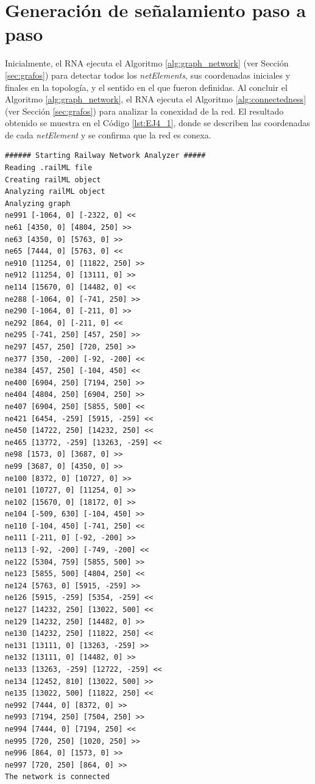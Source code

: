 \section{Generación de señalamiento paso a paso}

Inicialmente, el RNA ejecuta el Algoritmo \ref{alg:graph_network} (ver Sección \ref{sec:grafos}) para detectar todos los \textit{netElements}, sus coordenadas iniciales y finales en la topología, y el sentido en el que fueron definidas. Al concluir el Algoritmo \ref{alg:graph_network}, el RNA ejecuta el Algoritmo \ref{alg:connectedness} (ver Sección \ref{sec:grafos}) para analizar la conexidad de la red. El resultado obtenido se muestra en el Código \ref{lst:EJ4_1}, donde se describen las coordenadas de cada \textit{netElement} y se confirma que la red es conexa.

\begin{lstlisting}[language = {}, tabsize=4, basicstyle=\footnotesize\ttfamily, showspaces=false, showstringspaces=false, caption = Detección de \textit{netElements} por parte del RNA , label = {lst:EJ4_1}]
###### Starting Railway Network Analyzer #####
Reading .railML file
Creating railML object
Analyzing railML object
Analyzing graph
ne991 [-1064, 0] [-2322, 0] <<
ne61 [4350, 0] [4804, 250] >> 
ne63 [4350, 0] [5763, 0] >>
ne65 [7444, 0] [5763, 0] <<
ne910 [11254, 0] [11822, 250] >>
ne912 [11254, 0] [13111, 0] >>
ne114 [15670, 0] [14482, 0] <<
ne288 [-1064, 0] [-741, 250] >>
ne290 [-1064, 0] [-211, 0] >>
ne292 [864, 0] [-211, 0] <<
ne295 [-741, 250] [457, 250] >>
ne297 [457, 250] [720, 250] >>
ne377 [350, -200] [-92, -200] <<
ne384 [457, 250] [-104, 450] <<
ne400 [6904, 250] [7194, 250] >>
ne404 [4804, 250] [6904, 250] >>
ne407 [6904, 250] [5855, 500] <<
ne421 [6454, -259] [5915, -259] <<
ne450 [14722, 250] [14232, 250] <<
ne465 [13772, -259] [13263, -259] <<
ne98 [1573, 0] [3687, 0] >>
ne99 [3687, 0] [4350, 0] >>
ne100 [8372, 0] [10727, 0] >>
ne101 [10727, 0] [11254, 0] >>
ne102 [15670, 0] [18172, 0] >>
ne104 [-509, 630] [-104, 450] >>
ne110 [-104, 450] [-741, 250] <<
ne111 [-211, 0] [-92, -200] >>
ne113 [-92, -200] [-749, -200] <<
ne122 [5304, 759] [5855, 500] >>
ne123 [5855, 500] [4804, 250] <<
ne124 [5763, 0] [5915, -259] >>
ne126 [5915, -259] [5354, -259] <<
ne127 [14232, 250] [13022, 500] <<
ne129 [14232, 250] [14482, 0] >>
ne130 [14232, 250] [11822, 250] <<
ne131 [13111, 0] [13263, -259] >>
ne132 [13111, 0] [14482, 0] >>
ne133 [13263, -259] [12722, -259] <<
ne134 [12452, 810] [13022, 500] >>
ne135 [13022, 500] [11822, 250] <<
ne992 [7444, 0] [8372, 0] >>
ne993 [7194, 250] [7504, 250] >>
ne994 [7444, 0] [7194, 250] <<
ne995 [720, 250] [1020, 250] >>
ne996 [864, 0] [1573, 0] >>
ne997 [720, 250] [864, 0] >>
The network is connected
\end{lstlisting}

